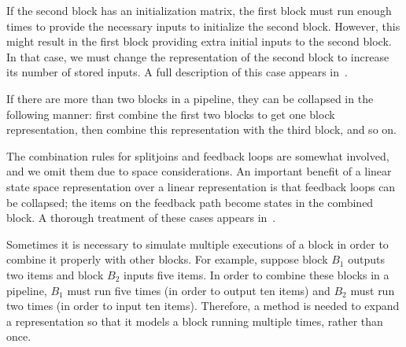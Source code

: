 If the second block has an initialization matrix, the first block must
run enough times to provide the necessary inputs to initialize the
second block. However, this might result in the first block providing
extra initial inputs to the second block. In that case, we must change
the representation of the second block to increase its number of
stored inputs.  A full description of this case appears
in~\cite[pp. 46-49]{Agrawal04}.

If there are more than two blocks in a pipeline, they can be collapsed
in the following manner: first combine the first two blocks to get one
block representation, then combine this representation with the third
block, and so on.


The combination rules for splitjoins and feedback loops are somewhat
involved, and we omit them due to space considerations.  An important
benefit of a linear state space representation over a linear
representation is that feedback loops can be collapsed; the items on
the feedback path become states in the combined block.  A thorough
treatment of these cases appears in~\cite[pp. 36-43]{Agrawal04}.

\label{sec:expansion}

Sometimes it is necessary to simulate multiple executions of a block
in order to combine it properly with other blocks.  For example,
suppose block $B_1$ outputs two items and block $B_2$ inputs five
items. In order to combine these blocks in a pipeline, $B_1$ must run
five times (in order to output ten items) and $B_2$ must run two times
(in order to input ten items). Therefore, a method is needed to expand
a representation so that it models a block running multiple times,
rather than once.

